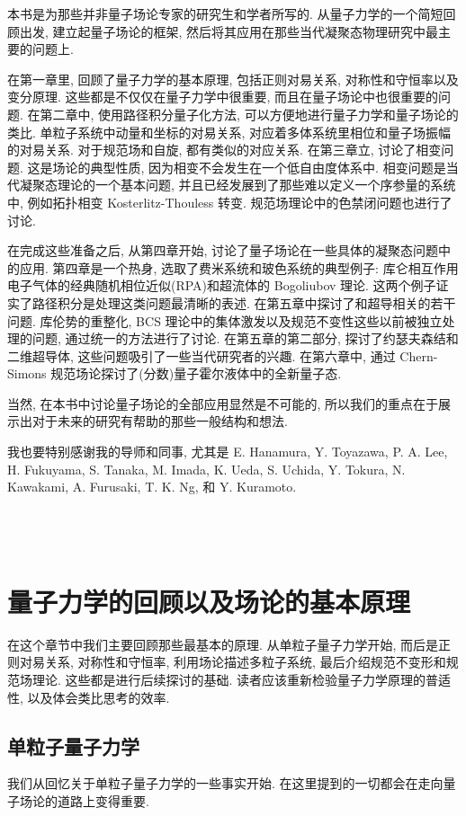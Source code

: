 \documentclass[b5paper]{book}
\begin{document}
{本书是为那些并非量子场论专家的研究生和学者所写的. 从量子力学的一个简短回顾出发, 建立起量子场论的框架, 然后将其应用在那些当代凝聚态物理研究中最主要的问题上.

在第一章里, 回顾了量子力学的基本原理, 包括正则对易关系, 对称性和守恒率以及变分原理. 这些都是不仅仅在量子力学中很重要, 而且在量子场论中也很重要的问题. 在第二章中, 使用路径积分量子化方法, 可以方便地进行量子力学和量子场论的类比. 单粒子系统中动量和坐标的对易关系, 对应着多体系统里相位和量子场振幅的对易关系. 对于规范场和自旋, 都有类似的对应关系. 在第三章立, 讨论了相变问题. 这是场论的典型性质, 因为相变不会发生在一个低自由度体系中. 相变问题是当代凝聚态理论的一个基本问题, 并且已经发展到了那些难以定义一个序参量的系统中, 例如拓扑相变 Kosterlitz-Thouless 转变. 规范场理论中的色禁闭问题也进行了讨论.

在完成这些准备之后, 从第四章开始, 讨论了量子场论在一些具体的凝聚态问题中的应用. 第四章是一个热身, 选取了费米系统和玻色系统的典型例子: 库仑相互作用电子气体的经典随机相位近似(RPA)和超流体的 Bogoliubov 理论. 这两个例子证实了路径积分是处理这类问题最清晰的表述. 在第五章中探讨了和超导相关的若干问题. 库伦势的重整化, BCS 理论中的集体激发以及规范不变性这些以前被独立处理的问题, 通过统一的方法进行了讨论. 在第五章的第二部分, 探讨了约瑟夫森结和二维超导体, 这些问题吸引了一些当代研究者的兴趣. 在第六章中, 通过 Chern-Simons 规范场论探讨了(分数)量子霍尔液体中的全新量子态.

当然, 在本书中讨论量子场论的全部应用显然是不可能的, 所以我们的重点在于展示出对于未来的研究有帮助的那些一般结构和想法.

我也要特别感谢我的导师和同事, 尤其是 E. Hanamura, Y. Toyazawa, P. A. Lee, H. Fukuyama, S. Tanaka, M. Imada, K. Ueda, S. Uchida, Y. Tokura, N. Kawakami, A. Furusaki, T. K. Ng, 和 Y. Kuramoto.
\\
\\
\\
\\

}
\tableofcontents
\mainmatter
\chapter{量子力学的回顾以及场论的基本原理}
在这个章节中我们主要回顾那些最基本的原理. 从单粒子量子力学开始, 而后是正则对易关系, 对称性和守恒率, 利用场论描述多粒子系统, 最后介绍规范不变形和规范场理论. 这些都是进行后续探讨的基础. 读者应该重新检验量子力学原理的普适性, 以及体会类比思考的效率. 
\section{单粒子量子力学}
我们从回忆关于单粒子量子力学的一些事实开始. 在这里提到的一切都会在走向量子场论的道路上变得重要.
\end{document}
